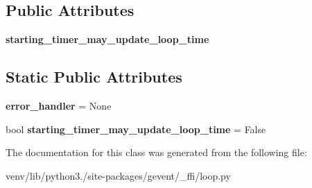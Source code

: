 \subsection*{Public Attributes}
\begin{DoxyCompactItemize}
\item 
\mbox{\label{classgevent_1_1__ffi_1_1loop_1_1_abstract_loop_ab64cf842af9e39b5c69353065066d955}} 
{\bfseries starting\+\_\+timer\+\_\+may\+\_\+update\+\_\+loop\+\_\+time}
\end{DoxyCompactItemize}
\subsection*{Static Public Attributes}
\begin{DoxyCompactItemize}
\item 
\mbox{\label{classgevent_1_1__ffi_1_1loop_1_1_abstract_loop_ad7bcc03ba8e595d71c05b9d946bc841a}} 
{\bfseries error\+\_\+handler} = None
\item 
\mbox{\label{classgevent_1_1__ffi_1_1loop_1_1_abstract_loop_ae80995243cf56519d048ee43f9d32190}} 
bool {\bfseries starting\+\_\+timer\+\_\+may\+\_\+update\+\_\+loop\+\_\+time} = False
\end{DoxyCompactItemize}


The documentation for this class was generated from the following file\+:\begin{DoxyCompactItemize}
\item 
venv/lib/python3./site-\/packages/gevent/\+\_\+ffi/loop.\+py\end{DoxyCompactItemize}
